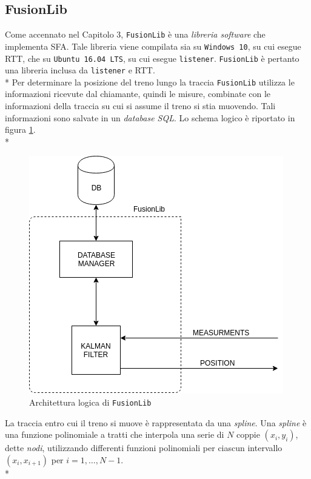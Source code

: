 \subsection{FusionLib}
Come accennato nel Capitolo 3, \texttt{FusionLib} \`e una \emph{libreria software} che implementa SFA. Tale libreria viene compilata sia su \texttt{Windows 10}, su cui esegue RTT, che su \texttt{Ubuntu 16.04 LTS}, su cui esegue \texttt{listener}. \texttt{FusionLib} \`e pertanto una libreria inclusa da \texttt{listener} e RTT.\\*
Per determinare la posizione del treno lungo la traccia \texttt{FusionLib} utilizza le informazioni ricevute dal chiamante, quindi le misure, combinate con le informazioni della traccia su cui si assume il treno si stia muovendo. Tali informazioni sono salvate in un \emph{database SQL}. Lo schema logico \`e riportato in figura \ref{fig:fulib}.\\*
\begin{figure}[h]
	\centering
	\includegraphics[width=\linewidth]{img/fulib}
	\caption{Architettura logica di \texttt{FusionLib}}
	\label{fig:fulib}
\end{figure}
La traccia entro cui il treno si muove \`e rappresentata da una \emph{spline}. Una \emph{spline} \`e una funzione polinomiale a tratti che interpola una serie di $N$ coppie $(x_i,y_i)$, dette \emph{nodi}, utilizzando differenti funzioni polinomiali per ciascun intervallo $(x_i,x_{i+1})$ per $i = 1,\dots,N-1$.\\*

